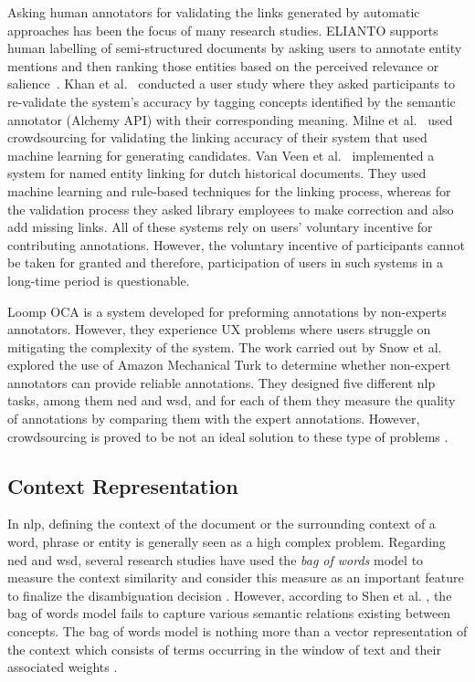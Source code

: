 Asking human annotators for validating the links generated by automatic approaches has been the focus of many research studies. ELIANTO supports human labelling of semi-structured documents by asking users to annotate entity mentions and then ranking those entities based on the perceived relevance or salience~\cite{2}. Khan et al.~\cite{5} conducted a user study where they asked participants to re-validate the system's accuracy by tagging concepts identified by the semantic annotator (Alchemy API) with their corresponding meaning. Milne et al.~\cite{9} used crowdsourcing for validating the linking accuracy of their system that used machine learning for generating candidates. Van Veen et al.~\cite{31} implemented a system for named entity linking for dutch historical documents. They used machine learning and rule-based techniques for the linking process, whereas for the validation process they asked library employees to make correction and also add missing links. All of these systems rely on users' voluntary incentive for contributing annotations. However, the voluntary incentive of participants cannot be taken for granted and therefore, participation of users in such systems in a long-time period is questionable.

Loomp OCA \cite{15,16} is a system developed for preforming annotations by non-experts annotators. However, they experience UX problems where users struggle on mitigating the complexity of the system. The work carried out by Snow et al. \cite{32} explored the use of Amazon Mechanical Turk to determine whether non-expert annotators can provide reliable annotations. They designed five different \ac{nlp} tasks, among them \ac{ned} and \ac{wsd}, and for each of them they measure the quality of annotations by comparing them with the expert annotations. However, crowdsourcing is proved to be not an ideal solution to these type of problems \cite{41}.

\subsection{Context Representation}
\label{framework:relatedword_context}
In \ac{nlp}, defining the context of the document or the surrounding context of a word, phrase or entity is generally seen as a high complex problem. Regarding \ac{ned} and \ac{wsd}, several research studies have used the \textit{bag of words} model to measure the context similarity and consider this measure as an important feature to finalize the disambiguation decision \cite{20}. However, according to Shen et al. \cite{20}, the bag of words model fails to capture various semantic relations existing between concepts. The bag of words model is nothing more than a vector representation of the context which consists of terms occurring in the window of text and their associated weights \cite{20}. 

